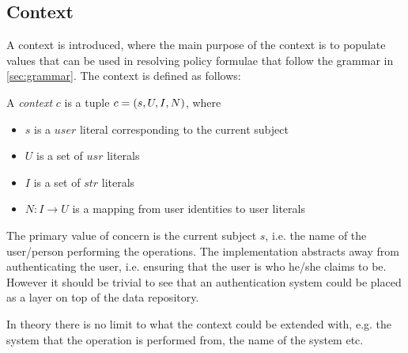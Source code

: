 \subsection{Context}
A context is introduced, where the main purpose of the context is to populate values that can be used in resolving policy formulae that follow the grammar in \autoref{sec:grammar}. The context is defined as follows:
\begin{definition}[Context]
A \emph{context} $c$ is a tuple $c = \left( s, U, I, N \right)$, where
\begin{itemize}
    \item $s$ is a $user$ literal corresponding to the current subject
    \item $U$ is a set of $usr$ literals
    \item $I$ is a set of $str$ literals
    \item $N : I \rightarrow U$ is a mapping from user identities to user literals
\end{itemize}
\end{definition}
The primary value of concern is the current subject $s$, i.e. the name of the user/person performing the operations. The implementation abstracts away from authenticating the user, i.e. ensuring that the user is who he/she claims to be. However it should be trivial to see that an authentication system could be placed as a layer on top of the data repository.

In theory there is no limit to what the context could be extended with, e.g. the system that the operation is performed from, the name of the system etc.



